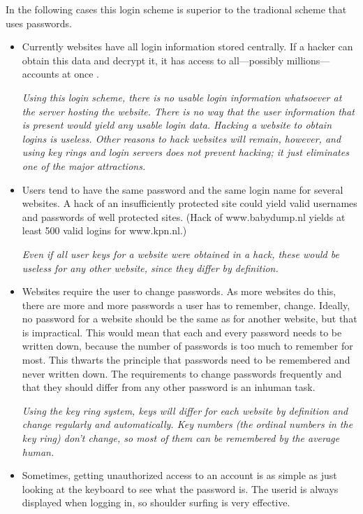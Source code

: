 In the following cases this login scheme is superior to the tradional scheme that uses passwords.
\begin{itemize}
\item Currently websites have all login information stored centrally.
If a hacker can obtain this data and decrypt it,
it has access to all---possibly millions---accounts at once \cite{wiki:linkedin}.
\par
\emph{Using this login scheme,
there is no usable login information whatsoever at the server hosting the website.
There is no way that the user information that \emph{is} present would yield any usable login data.
Hacking a website to obtain logins is useless.
\newline
Other reasons to hack websites will remain,
however,
and using key rings and login servers does not prevent hacking;
it just eliminates one of the major attractions.}
\item Users tend to have the same password and the same login name for several websites.
A hack of an insufficiently protected site could yield valid usernames and passwords of well protected sites.
(Hack of www.babydump.nl yields at least 500 valid logins for www.kpn.nl.)
\par
\emph{Even if all user keys for a website were obtained in a hack,
these would be useless for any other website,
since they differ by definition.}
\item Websites require the user to change passwords.
As more websites do this,
there are more and more passwords a user has to remember,
change.
Ideally,
no password for a website should be the same as for another website,
but that is impractical.
This would mean that each and every password needs to be written down,
because the number of passwords is too much to remember for most.
This thwarts the principle that passwords need to be remembered and never written down.
The requirements to change passwords frequently and that they should differ from any other password is an inhuman task.
\par
\emph{Using the key ring system,
keys will differ for each website by definition and change regularly and automatically.
Key numbers
(the ordinal numbers in the key ring)
don't change,
so most of them can be remembered by the average human.}
\item Sometimes,
getting unauthorized access to an account is as simple as just looking at the keyboard to see what the password is.
The userid is always displayed when logging in,
so shoulder surfing is very effective.

\end{itemize}
